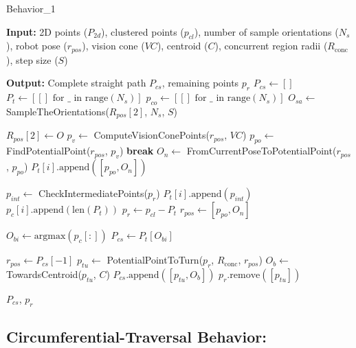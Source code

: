 \begin{algorithm}[H]
    \caption{Behavior\_1}
    \label{alg:behavioral1}
    \begin{algorithmic}[1]

    \Statex \textbf{Input:} 2D points ($P_{2d}$), clustered points ($p_{cl}$), number of sample orientations ($N_s$), robot pose ($r_{pos}$), vision cone ($VC$), centroid ($C$), concurrent region radii ($R_{\text{conc}}$), step size ($S$)

    \Statex \textbf{Output:} Complete straight path $P_{cs}$, remaining points $p_r$
    \newline
    \State $P_{cs} \leftarrow []$
    \State $P_t \leftarrow [[] \text{ for } \_ \text{ in range}(N_s)]$
    \State $p_{co} \leftarrow [[] \text{ for } \_ \text{ in range}(N_s)]$
    \State $O_{sa} \leftarrow$ SampleTheOrientations($R_{pos}[2]$, $N_s$, $S$)
    
        \State $R_{pos}[2] \leftarrow O$
            \State $p_v \leftarrow$ ComputeVisionConePoints($r_{pos}$, $VC$)
            \State $p_{po} \leftarrow$ FindPotentialPoint($r_{pos}$, $p_v$)
                \State \textbf{break}
            \EndIf
            \State $O_n \leftarrow$ FromCurrentPoseToPotentialPoint($r_{pos}$, $p_{po}$)
            \State $P_t[i].\text{append}([p_{po}, O_n])$
            
            \State $p_{int} \leftarrow$ CheckIntermediatePoints($p_r$)
            \State $P_t[i].\text{append}(p_{int})$
            \State $p_c[i].\text{append}(\text{len}(P_t))$
            \State $p_r \leftarrow p_{cl} - P_t$
            \State $r_{pos} \leftarrow [p_{po}, O_n]$
        \EndWhile
    \EndFor
    
    \State $O_{bi} \leftarrow \text{argmax}(p_c[:])$
    \State $P_{cs} \leftarrow P_t[O_{bi}]$
    
    \State $r_{pos} \leftarrow P_{cs}[-1]$
    \State $p_{tu} \leftarrow$ PotentialPointToTurn($p_r$, $R_{\text{conc}}$, $r_{pos}$)
    \State $O_b \leftarrow$ TowardsCentroid($p_{tu}$, $C$)
    \State $P_{cs}.\text{append}([p_{tu}, O_b])$
    \State $p_r.\text{remove}([p_{tu}])$
    
    \State \Return $P_{cs}$, $p_r$
    \end{algorithmic}
    \end{algorithm}
    


\subsection{Circumferential-Traversal Behavior:} 

